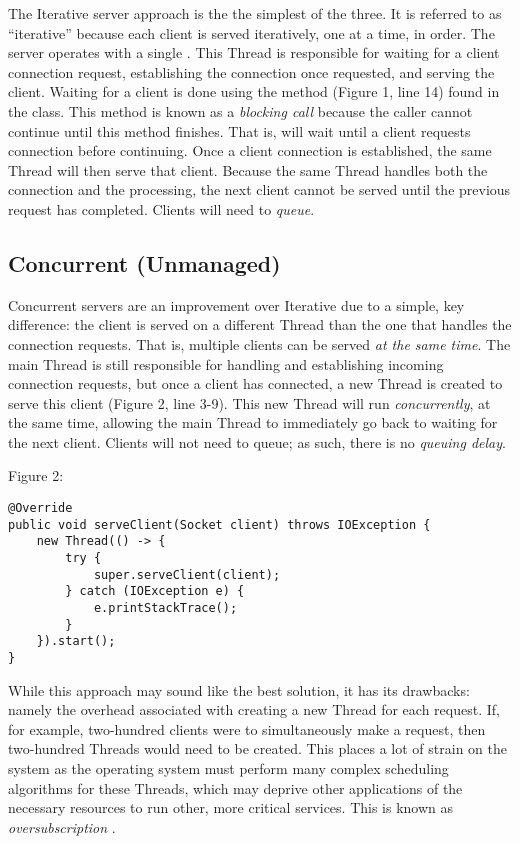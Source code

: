 The Iterative server approach is the the simplest of the three. 
It is referred to as ``iterative'' because each client is served iteratively, one at a time, in order. 
The server operates with a single . 
This Thread is responsible for waiting for a client connection request, establishing the connection once requested, and serving the client. 
Waiting for a client is done using the  method (Figure 1, line 14) found in the  class.
This method is known as a \textit{blocking call} because the caller cannot continue until this method finishes. 
That is,  will wait until a client requests connection before continuing.
Once a client connection is established, the same Thread will then serve that client. 
Because the same Thread handles both the connection and the processing, the next client cannot be served until the previous request has completed. Clients will need to \textit{queue}.

\subsection{Concurrent (Unmanaged)}

Concurrent servers are an improvement over Iterative due to a simple, key difference: the client is served on a different Thread than the one that handles the connection requests. 
That is, multiple clients can be served \textit{at the same time}.
The main Thread is still responsible for handling and establishing incoming connection requests, but once a client has connected, a new Thread is created to serve this client (Figure 2, line 3-9). 
This new Thread will run \textit{concurrently}, at the same time, allowing the main Thread to immediately go back to waiting for the next client. 
Clients will not need to queue; as such, there is no \textit{queuing delay}.

Figure 2:
\begin{lstlisting}
@Override
public void serveClient(Socket client) throws IOException {
	new Thread(() -> {
		try {
			super.serveClient(client);
		} catch (IOException e) {
			e.printStackTrace();
		}
	}).start();
}
\end{lstlisting}

While this approach may sound like the best solution, it has its drawbacks: namely the overhead associated with creating a new Thread for each request. 
If, for example, two-hundred clients were to simultaneously make a request, then two-hundred Threads would need to be created. 
This places a lot of strain on the system as the operating system must perform many complex scheduling algorithms for these Threads, which may deprive other applications of the necessary resources to run other, more critical services. 
This is known as \textit{oversubscription} \cite{microsoft}.

